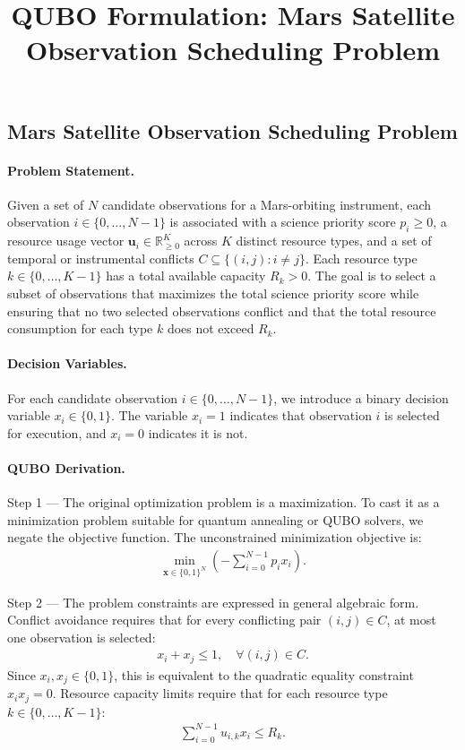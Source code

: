 \documentclass[12pt]{article}
\title{QUBO Formulation: Mars Satellite Observation Scheduling Problem}
\date{}
\begin{document}
\maketitle

\subsection*{Mars Satellite Observation Scheduling Problem}

\paragraph{Problem Statement.}
Given a set of $N$ candidate observations for a Mars-orbiting instrument, each observation $i \in \{0, \dots, N-1\}$ is associated with a science priority score $p_i \ge 0$, a resource usage vector $\mathbf{u}_i \in \mathbb{R}^K_{\ge 0}$ across $K$ distinct resource types, and a set of temporal or instrumental conflicts $C \subseteq \{(i,j) : i \neq j\}$. Each resource type $k \in \{0, \dots, K-1\}$ has a total available capacity $R_k > 0$. The goal is to select a subset of observations that maximizes the total science priority score while ensuring that no two selected observations conflict and that the total resource consumption for each type $k$ does not exceed $R_k$.

\paragraph{Decision Variables.}
For each candidate observation $i \in \{0, \dots, N-1\}$, we introduce a binary decision variable $x_i \in \{0,1\}$. The variable $x_i = 1$ indicates that observation $i$ is selected for execution, and $x_i = 0$ indicates it is not.

\paragraph{QUBO Derivation.}
Step 1 --- The original optimization problem is a maximization. To cast it as a minimization problem suitable for quantum annealing or QUBO solvers, we negate the objective function. The unconstrained minimization objective is:
\begin{align}
\min_{\mathbf{x} \in \{0,1\}^N} \left( -\sum_{i=0}^{N-1} p_i x_i \right).
\end{align}

Step 2 --- The problem constraints are expressed in general algebraic form. Conflict avoidance requires that for every conflicting pair $(i,j) \in C$, at most one observation is selected:
\begin{align}
x_i + x_j \le 1, \quad \forall (i,j) \in C.
\end{align}
Since $x_i, x_j \in \{0,1\}$, this is equivalent to the quadratic equality constraint $x_i x_j = 0$. Resource capacity limits require that for each resource type $k \in \{0, \dots, K-1\}$:
\begin{align}
\sum_{i=0}^{N-1} u_{i,k} x_i \le R_k.
\end{align}
\end{document}
